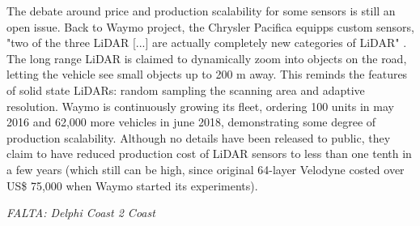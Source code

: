 The debate around price and production scalability for some sensors is still
an open issue. Back to Waymo project, the Chrysler Pacifica equipps custom 
sensors, "two of the three LiDAR [...] are actually 
completely new categories of LiDAR" \cite{Waymoteam2017}. The long range 
LiDAR is claimed to dynamically zoom into objects on the road, letting the
vehicle see small objects up to 200 m away. 
This  reminds the features of solid state LiDARs: random sampling the scanning 
area and adaptive resolution. Waymo is continuously growing its fleet, ordering 
100 units in may 2016 and 62,000 more vehicles in june 2018, demonstrating some 
degree of production scalability. 
Although no details have been released to public, they claim to have reduced
production cost of LiDAR sensors to less than one tenth in a few years 
(which still can be high, since original 64-layer Velodyne costed over 
US\$ 75,000 when Waymo started its experiments).


\emph{FALTA: Delphi Coast 2 Coast}


